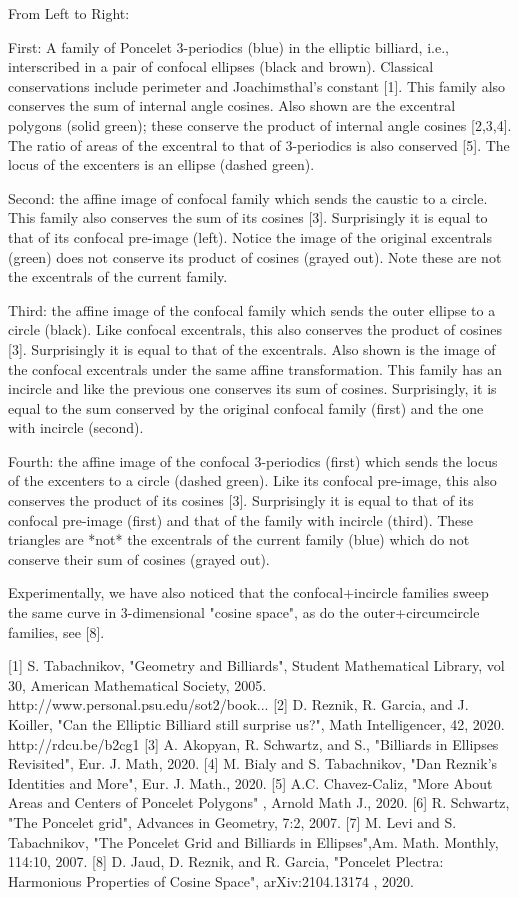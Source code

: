 From Left to Right:

First: A family of Poncelet 3-periodics (blue) in the elliptic billiard, i.e., interscribed in a pair of confocal ellipses (black and brown). Classical conservations include perimeter and Joachimsthal's constant [1].  This family also conserves the sum of internal angle cosines. Also shown are the excentral polygons (solid green); these conserve the product of internal angle cosines [2,3,4]. The ratio of areas of the excentral to that of 3-periodics is also conserved [5]. The locus of the excenters is an ellipse (dashed green). 

Second: the affine image of confocal family which sends the caustic to a circle. This family also conserves the sum of its cosines [3]. Surprisingly it is equal to that of its confocal pre-image (left). Notice the image of the original excentrals (green) does not conserve its product of cosines (grayed out). Note these are not the excentrals of the current family.

Third: the affine image of the confocal family which sends the outer ellipse to a circle (black). Like confocal excentrals, this also conserves the product of cosines [3]. Surprisingly it is equal to that of the excentrals. Also shown is the image of the confocal excentrals under the same affine transformation. This family has an incircle and like the previous one conserves its sum of cosines. Surprisingly, it is equal to the sum conserved by the original confocal family (first) and the one with incircle (second).

Fourth: the affine image of the confocal 3-periodics (first) which sends the locus of the excenters to a circle (dashed green). Like its confocal pre-image, this also conserves the product of its cosines [3]. Surprisingly it is equal to that of its confocal pre-image (first) and that of the family with incircle (third). These triangles are *not* the excentrals of the current family (blue) which do not conserve their sum of cosines (grayed out).

Experimentally, we have also noticed that the confocal+incircle families sweep the same curve in 3-dimensional "cosine space", as do the outer+circumcircle families, see [8].

[1] S. Tabachnikov, "Geometry and Billiards", Student Mathematical Library, vol 30, American Mathematical Society, 2005. http://www.personal.psu.edu/sot2/book...​
[2] D. Reznik, R. Garcia, and J. Koiller, "Can the Elliptic Billiard still surprise us?", Math Intelligencer, 42, 2020. http://rdcu.be/b2cg1​
[3] A. Akopyan, R. Schwartz, and S., "Billiards in Ellipses Revisited", Eur. J. Math, 2020. 
[4] M. Bialy and S. Tabachnikov, "Dan Reznik's Identities and More",
Eur. J. Math., 2020.
[5] A.C. Chavez-Caliz, "More About Areas and Centers of Poncelet Polygons" , Arnold Math J., 2020.
[6] R. Schwartz,  "The Poncelet grid", Advances in Geometry, 7:2, 2007.
[7] M. Levi and  S. Tabachnikov, "The Poncelet Grid and Billiards in Ellipses",Am. Math. Monthly,  114:10, 2007.
[8] D. Jaud, D. Reznik, and R. Garcia, "Poncelet Plectra: Harmonious Properties of Cosine Space", arXiv:2104.13174 , 2020.